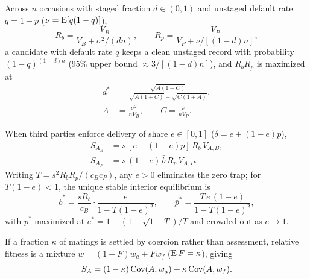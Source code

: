 \begin{proposition}\label{prop:staging}
Across $n$ occasions with staged fraction $d\in(0,1)$ and unstaged default rate $q=1-p$ ($\nu=\operatorname{E}[q(1-q)]$),
\begin{equation}
R_b=\frac{V_B}{V_B+\sigma^2/(dn)},\qquad R_p=\frac{V_P}{V_P+\nu/[(1-d)n]},\label{eq:staging}
\end{equation}
a candidate with default rate $q$ keeps a clean unstaged record with probability $(1-q)^{(1-d)n}$ (95\% upper bound $\approx 3/[(1-d)n]$), and $R_bR_p$ is maximized at
\begin{equation}
\begin{aligned}
d^* &= \frac{\sqrt{A(1+C)}}{\sqrt{A(1+C)}+\sqrt{C(1+A)}},\\
A &= \frac{\sigma^2}{nV_B},\qquad C=\frac{\nu}{nV_P}.
\end{aligned}\label{eq:dstar}
\end{equation}
\end{proposition}

\begin{proposition}\label{prop:enforce}
When third parties enforce delivery of share $e\in[0,1]$ ($\delta=e+(1-e)p$),
\begin{equation}
\begin{aligned}
S_{A_B} &= s\,[e+(1-e)\bar p]\,R_b\,V_{A,B},\\
S_{A_P} &= s\,(1-e)\,\bar b\,R_p\,V_{A,P}.
\end{aligned}\label{eq:enforce}
\end{equation}
Writing $T=s^2R_bR_p/(c_Bc_P)$, any $e>0$ eliminates the zero trap; for $T(1-e)<1$, the unique stable interior equilibrium is
\begin{equation}
\bar b^*=\frac{sR_b}{c_B}\cdot\frac{e}{1-T(1-e)^2},\qquad \bar p^*=\frac{T\,e\,(1-e)}{1-T(1-e)^2},\label{eq:enforceeq}
\end{equation}
with $\bar p^*$ maximized at $e^*=1-(1-\sqrt{1-T})/T$ and crowded out as $e\to1$.
\end{proposition}

If a fraction $\kappa$ of matings is settled by coercion rather than assessment, relative fitness is a mixture $w=(1-F)w_a+Fw_f$ ($\operatorname{E} F=\kappa$), giving
\begin{equation}
S_A=(1-\kappa)\operatorname{Cov}(A,w_a)+\kappa\operatorname{Cov}(A,w_f).\label{eq:coercion}
\end{equation}

